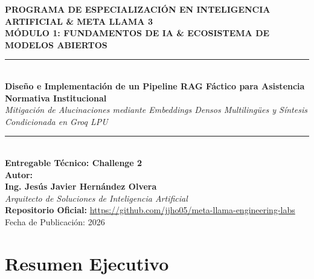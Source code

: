 \documentclass[12pt,letterpaper]{article}
\begin{document}
\begin{titlepage}
  \centering
  \vspace*{1.5cm}
  
  {\Large\textbf{PROGRAMA DE ESPECIALIZACIÓN EN INTELIGENCIA ARTIFICIAL \& META LLAMA 3}}\\[0.8cm]
  {\large\textbf{MÓDULO 1: FUNDAMENTOS DE IA \& ECOSISTEMA DE MODELOS ABIERTOS}}\\[1.5cm]
  
  \rule{\linewidth}{0.6mm}\\[0.5cm]
  {\LARGE\textbf{Diseño e Implementación de un Pipeline RAG Fáctico para Asistencia Normativa Institucional}}\\[0.3cm]
  {\large\textit{Mitigación de Alucinaciones mediante Embeddings Densos Multilingües y Síntesis Condicionada en Groq LPU}}\\[0.2cm]
  \rule{\linewidth}{0.6mm}\\[2cm]
  
  \textbf{Entregable Técnico: Challenge 2}\\[0.8cm]
  
  \textbf{Autor:}\\
  {\Large\textbf{Ing. Jesús Javier Hernández Olvera}}\\
  \textit{Arquitecto de Soluciones de Inteligencia Artificial}\\[2.5cm]
  
  \vfill
  {\large\textbf{Repositorio Oficial:}} \url{https://github.com/jjho05/meta-llama-engineering-labs}\\[0.3cm]
  {\small Fecha de Publicación: 2026}
\end{titlepage}

\newpage
{}

\section*{Resumen Ejecutivo}
\end{document}
